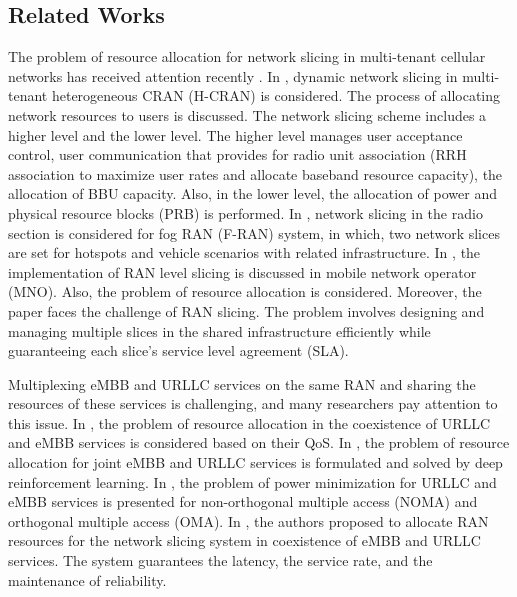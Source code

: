 \documentclass[conference]{IEEEtran}
\begin{document}
\subsection{Related Works}
The problem of resource allocation for network slicing in multi-tenant cellular networks has received attention recently \cite{feng2020dynamic,lee2018dynamic,lee2016new}.
In \cite{lee2018dynamic}, dynamic network slicing in multi-tenant heterogeneous CRAN (H-CRAN) is considered. The process of allocating network resources to users is discussed. The network slicing scheme includes a higher level and the lower level. The higher level manages user acceptance control, user communication that provides for radio unit association (RRH association to maximize user rates and allocate baseband resource capacity), the allocation of BBU capacity. Also, in the lower level, the allocation of power and physical resource blocks (PRB) is performed.
In \cite{xiang2020realization}, network slicing in the radio section is considered for fog RAN (F-RAN) system, in which, two network slices are set for hotspots and vehicle scenarios with related infrastructure. In \cite{elayoubi20195g,d2020toward}, the implementation of RAN level slicing is discussed in mobile network operator (MNO). Also, the problem of resource allocation is considered. Moreover, the paper faces the challenge of RAN slicing. The problem involves designing and managing multiple slices in the shared infrastructure efficiently while guaranteeing each slice's service level agreement (SLA).


Multiplexing eMBB and URLLC services on the same RAN and sharing the resources of these services is challenging, and many researchers pay attention to this issue.
In \cite{setayesh2020joint,yang2020should}, the problem of resource allocation in the coexistence of URLLC and eMBB services is considered based on their QoS. 
In \cite{alsenwi2021intelligent}, the problem of resource allocation for joint eMBB and URLLC services is formulated and solved by deep reinforcement learning.
 In \cite{saggese2021power}, the problem of power minimization for URLLC and eMBB services is presented for non-orthogonal multiple access (NOMA) and orthogonal multiple access (OMA).
 In \cite{korrai2020ran}, the authors proposed to allocate RAN resources for the network slicing system in coexistence of eMBB and URLLC services. The system guarantees the latency, the service rate, and the maintenance of reliability.
\end{document}
